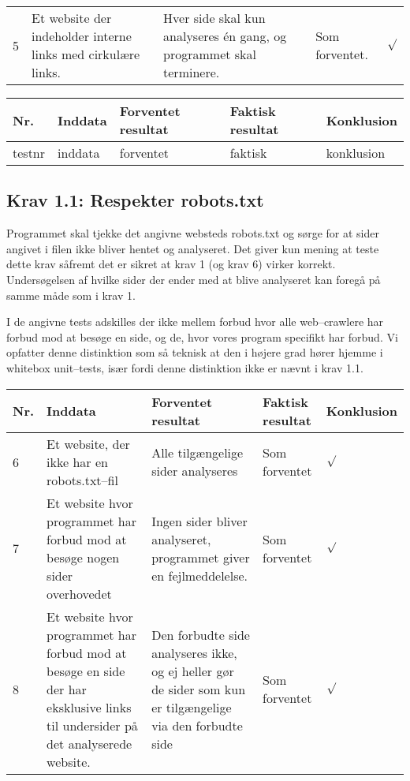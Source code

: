 \documentclass[a4paper,oneside,article]{memoir}
\begin{document}
\begin{landscape}
\begin{longtable}[c]{p{20pt}|p{220pt}|p{130pt}|p{130pt}|p{50pt}}
5 &
Et website der indeholder interne links med cirkulære links. &
Hver side skal kun analyseres én gang, og programmet skal
terminere. &
Som forventet. &
$\surd$

\end{longtable}

\begin{longtable}[c]{p{20pt}|p{220pt}|p{130pt}|p{130pt}|p{50pt}}
\textbf{Nr.} &
\textbf{Inddata} &
\textbf{Forventet resultat} &
\textbf{Faktisk resultat} &
\textbf{Konklusion} \\ \hline

testnr &
inddata &
forventet &
faktisk &
konklusion \\ \hline
\end{longtable}

\subsection{Krav 1.1: Respekter robots.txt}

Programmet skal tjekke det angivne websteds robots.txt og sørge for at
sider angivet i filen ikke bliver hentet og analyseret. Det giver kun
mening at teste dette krav såfremt det er sikret at krav 1 (og krav 6)
virker korrekt. Undersøgelsen af hvilke sider der ender med at blive
analyseret kan foregå på samme måde som i krav 1.

I de angivne tests adskilles der ikke mellem forbud hvor alle
web--crawlere har forbud mod at besøge en side, og de, hvor vores
program specifikt har forbud. Vi opfatter denne distinktion som så
teknisk at den i højere grad hører hjemme i whitebox unit--tests, især
fordi denne distinktion ikke er nævnt i krav 1.1.

\begin{longtable}[c]{p{20pt}|p{220pt}|p{130pt}|p{130pt}|p{50pt}}
\textbf{Nr.} &
\textbf{Inddata} &
\textbf{Forventet resultat} &
\textbf{Faktisk resultat} &
\textbf{Konklusion} \\ \hline

6 &
Et website, der ikke har en robots.txt--fil &
Alle tilgængelige sider analyseres &
Som forventet &
$\surd$ \\ \hline

7 &
Et website hvor programmet har forbud mod at besøge nogen sider
overhovedet &
Ingen sider bliver analyseret, programmet giver en fejlmeddelelse. &
Som forventet &
$\surd$ \\ \hline

8 &
Et website hvor programmet har forbud mod at besøge en side der har
eksklusive links til undersider på det analyserede website. &
Den forbudte side analyseres ikke, og ej heller gør de sider som kun
er tilgængelige via den forbudte side &
Som forventet &
$\surd$ \\ \hline


\end{longtable}
\end{landscape}
\end{document}
